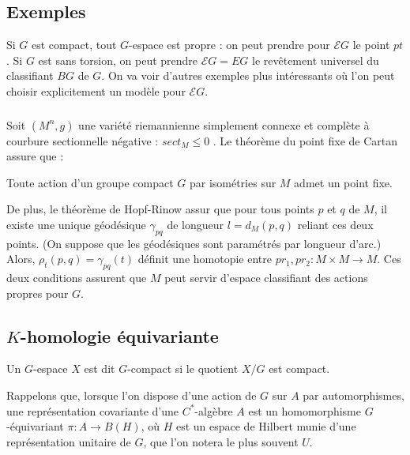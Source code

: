 
\subsection{Exemples}

Si $G$ est compact, tout $G$-espace est propre : on peut prendre pour $\mathcal E G$ le point $pt$. Si $G$ est sans torsion, on peut prendre $\mathcal E G=EG$ le revêtement universel du classifiant $BG$ de $G$. On va voir d'autres exemples plus intéressants où l'on peut choisir explicitement un modèle pour $\mathcal E G$. %

\subsubsection{} Soit $(M^n,g)$ une variété riemannienne simplement connexe et complète à courbure sectionnelle négative : $sect_M \leq 0$ . Le théorème du point fixe de Cartan %
assure que :
\begin{thm}[Cartan]
Toute action d'un groupe compact $G$ par isométries sur $M$ admet un point fixe.
\end{thm}
De plus, le théorème de Hopf-Rinow assur que pour tous points $p$ et $q$ de $M$, il existe une unique géodésique $\gamma_{pq}$ de longueur $l=d_M(p,q)$ reliant ces deux points. (On suppose que les géodésiques sont paramétrés par longueur d'arc.) \\

Alors, $\rho_t(p,q)=\gamma_{pq}(t)$ définit une homotopie entre $pr_1,pr_2 : M\times M\rightarrow M$. Ces deux conditions assurent que $M$ peut servir d'espace classifiant des actions propres pour $G$.

\subsection{$K$-homologie équivariante}

\begin{definition}
Un $G$-espace $X$ est dit $G$-compact si le quotient $X/G$ est compact.
\end{definition}

Rappelons que, lorsque l'on dispose d'une action de $G$ sur $A$ par automorphismes, une représentation covariante d'une $C^*$-algèbre $A$ est un homomorphisme $G$-équivariant $\pi : A\rightarrow B(H)$, où $H$ est un espace de Hilbert munie d'une représentation unitaire de $G$, que l'on notera le plus souvent $U$.\\

